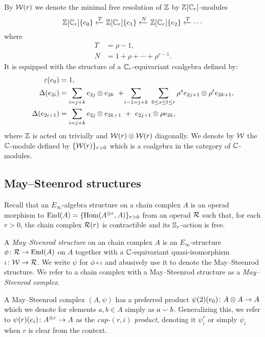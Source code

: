 By $\mathcal{W}(r)$ we denote the minimal free resolution of $\mathbb{Z}$ by $\mathbb{Z}[\mathbb{C}_r]$-modules
\begin{equation}\label{eq: minimal resolution}
	\mathbb{Z}[\mathbb{C}_r]\{e_0\} \xleftarrow{T} \mathbb{Z}[\mathbb{C}_r]\{e_1\} \xleftarrow{N} \mathbb{Z}[\mathbb{C}_r]\{e_2\} \xleftarrow{T} \cdots
\end{equation}
where
\begin{equation} \label{eq: T and R definition}
	\begin{split}
		T &= \rho - 1, \\
		N &= 1 + \rho + \cdots + \rho^{r-1}.
	\end{split}
\end{equation}
It is equipped with the structure of a $\mathbb{C}_r$-equivariant coalgebra defined by:
\begin{align*}
	\varepsilon(e_0) &= 1, \\
	\Delta(e_{2i}) &=
	\sum_{i=j+k} e_{2j} \otimes e_{2k} \ + \! \sum_{i-1=j+k} \ \sum_{0 \leq s \leq t \leq r} \rho^s e_{2j+1} \otimes \rho^t e_{2k+1}, \\
	\Delta(e_{2i+1}) &=
	\sum_{i=j+k} e_{2j} \otimes e_{2k+1} \ +\ e_{2j+1} \otimes \rho e_{2k},
\end{align*}
where $\mathbb{Z}$ is acted on trivially and $\mathcal{W}(r) \otimes \mathcal{W}(r)$ diagonally.
We denote by $\mathcal{W}$ the $\mathbb{C}$-module defined by $\{\mathcal{W}(r)\}_{r > 0}$ which is a coalgebra in the category of $\mathbb{C}$-modules.

\subsection{May--Steenrod structures}

Recall that an $E_\infty$-algebra structure on a chain complex $A$ is an operad morphism to $\mathrm{End}(A) = \{\mathrm{Hom}(A^{\otimes r}, A)\}_{r>0}$ from an operad $\mathcal{R}$ such that, for each $r > 0$, the chain complex $\mathcal{R}(r)$ is contractible and its $\mathbb{S}_r$-action is free.

A \textit{May--Steenrod structure} on an chain complex $A$ is an $E_\infty$-structure $\phi \colon \mathcal{R} \to \mathrm{End}(A)$ on $A$ together with a $\mathbb{C}$-equivariant quasi-isomorphism $\iota \colon \mathcal{W} \to \mathcal{R}$.
We write $\psi$ for $\phi \circ \iota$ and abusively use it to denote the May--Steenrod structure.
We refer to a chain complex with a May--Steenrod structure as a \textit{May--Steenrod complex}.

A May--Steenrod complex $(A,\psi)$ has a preferred product $\psi(2)(e_0) \colon A \otimes A \to A$ which we denote for elements $a, b \in A$ simply as $a \smallsmile b$.
Generalizing this, we refer to $\psi(r)(e_i) \colon A^{\otimes r} \to A$ as the \textit{cup-$(r,i)$ product}, denoting it $\psi_i^r$ or simply $\psi_i$ when $r$ is clear from the context.

